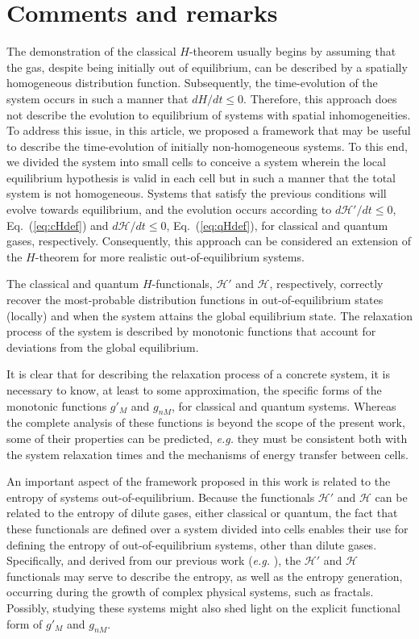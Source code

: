 \section{Comments and remarks}\label{sec:disscussion}

The demonstration of the classical $H$-theorem usually begins by assuming that the gas,
despite being initially out of equilibrium, can be described by a
spatially homogeneous distribution function. 
Subsequently, the time-evolution of the system occurs in such a manner that $dH/dt \leq 0$. 
Therefore, this approach does not describe the evolution to equilibrium of systems with spatial inhomogeneities.
To address this issue, in this article, we
proposed a framework that may be useful to describe the time-evolution of 
initially non-homogeneous systems. To this end, we divided the
system into small cells to conceive a system wherein the local equilibrium
hypothesis is valid in each cell but in such a manner that the total system is not homogeneous. Systems
that satisfy the previous conditions will evolve towards equilibrium, and the evolution
occurs according to $d\mathcal{H}'/dt\leq0$, Eq.~(\ref{eq:cHdef})
and $d\mathcal{H}/dt\leq0$, Eq.~(\ref{eq:qHdef}), for classical and quantum gases, respectively.
Consequently, this approach can be considered an extension of the $H$-theorem
for more realistic out-of-equilibrium systems.

The classical and quantum $H$-functionals, $\mathcal{H}'$ and $\mathcal{H}$, respectively,
correctly recover the most-probable distribution
functions in out-of-equilibrium states (locally) and when the system attains the global
equilibrium state. The relaxation process of the system is described by
monotonic functions that account for deviations from the global equilibrium.

It is clear that for describing the relaxation process of a concrete system,
it is necessary to know, at least to some approximation, the specific forms of the
monotonic functions $g'_M$ and $g_{nM}$, for classical and quantum systems.
Whereas the complete analysis of these functions is beyond the scope of the present work,
some of their properties can be predicted, \textit{e.g.} they must
be consistent both with the system relaxation times and the mechanisms of 
energy transfer between cells.

An important aspect of the framework proposed in this work is related to the entropy of systems
out-of-equilibrium. Because the functionals $\mathcal{H}'$ and $\mathcal{H}$ can be related to
the entropy of dilute gases, either classical or quantum, the fact that these functionals are defined
over a system divided into cells enables their use for defining the entropy
of out-of-equilibrium systems, other than dilute gases. Specifically, and 
derived from our previous work (\textit{e.g.} \cite{bib:nicolas2020,bib:nicolas2016}), the
$\mathcal H'$ and $\mathcal H$ functionals may serve to describe the entropy,
as well as the entropy generation, occurring during the
growth of complex physical systems, such as fractals. Possibly, studying these systems might also
shed light on the explicit functional form of $g'_M$ and $g_{nM}$.

